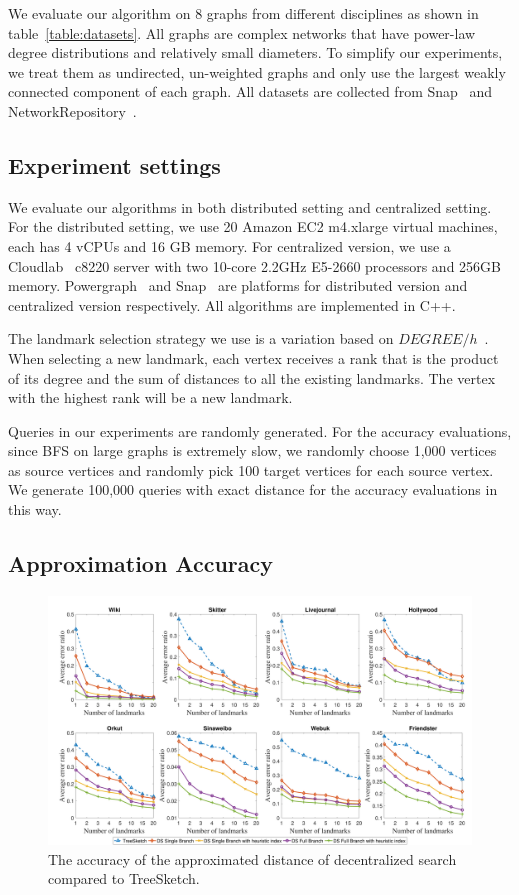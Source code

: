 We evaluate our algorithm on 8 graphs from different disciplines as shown in table~\ref{table:datasets}. All graphs are complex networks that have power-law degree distributions and relatively small diameters. To simplify our experiments, we treat them as undirected, un-weighted graphs and only use the largest weakly connected component of each graph. All datasets are collected from Snap~\cite{snapnets} and NetworkRepository~\cite{nr}.

\subsection{Experiment settings}
\label{eval_system}

We evaluate our algorithms in both distributed setting and centralized setting. For the distributed setting, we use 20 Amazon EC2 m4.xlarge virtual machines, each has 4 vCPUs and 16 GB memory. For centralized version, we use a Cloudlab~\cite{RicciEide:login14} c8220 server with two 10-core 2.2GHz E5-2660 processors and 256GB memory. Powergraph~\cite{180251} and Snap~\cite{snapnets} are platforms for distributed version and centralized version respectively. All algorithms are implemented in C++. 

The landmark selection strategy we use is a variation based on $DEGREE/h$~\cite{Potamias:2009:FSP:1645953.1646063}. When selecting a new landmark, each vertex receives a rank that is the product of its degree and the sum of distances to all the existing landmarks. The vertex with the highest rank will be a new landmark.

Queries in our experiments are randomly generated. For the accuracy evaluations, since BFS on large graphs is extremely slow, we randomly choose 1,000 vertices as source vertices and randomly pick 100 target vertices for each source vertex. We generate 100,000 queries with exact distance for the accuracy evaluations in this way.

\subsection{Approximation Accuracy}
\label{eval_accuracy}

\begin{figure}[ht]
    \centering
    \includegraphics[width=\linewidth]{./figures/accuracy_stepy.pdf}
    \caption{The accuracy of the approximated distance of decentralized search compared to TreeSketch.}
    \label{fig:accuracy_stepy}
\end{figure}

